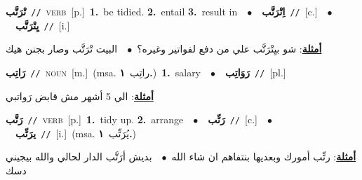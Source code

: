 \documentclass[10pt,a4paper,twoside]{article} %
\begin{document}
\begin{multicols}{2}
{\setlength\topsep{0pt}\textbf{\foreignlanguage{arabic}{تْرَتَّب}}\ {\color{gray}\texttt{//}\color{black}}\ \textsc{verb}\ [p.]\ \textbf{1.}~be tidied.  \textbf{2.}~entail  \textbf{3.}~result in\ \ $\bullet$\ \ \setlength\topsep{0pt}\textbf{\foreignlanguage{arabic}{اِتْرَتَّب}}\ {\color{gray}\texttt{//}\color{black}}\ [c.]\ \ $\bullet$\ \ \setlength\topsep{0pt}\textbf{\foreignlanguage{arabic}{يِتْرَتَّب}}\ {\color{gray}\texttt{//}\color{black}}\ [i.]\  \begin{flushright}\color{gray}\foreignlanguage{arabic}{\textbf{\underline{\foreignlanguage{arabic}{أمثلة}}}: شو بيِتْرَتَّب علي من دفع لفواتير وغيره؟\ $\bullet$\ \  البيت تْرَتَّب وصار بجنن هيك}\end{flushright}\color{black}} \vspace{2mm}

{\setlength\topsep{0pt}\textbf{\foreignlanguage{arabic}{رَاتِب}}\ {\color{gray}\texttt{//}\color{black}}\ \textsc{noun}\ [m.]\ \color{gray}(msa. \foreignlanguage{arabic}{راتِب}~\foreignlanguage{arabic}{\textbf{١.}})\color{black}\ \textbf{1.}~salary\ \ $\bullet$\ \ \setlength\topsep{0pt}\textbf{\foreignlanguage{arabic}{رَوَاتِب}}\ {\color{gray}\texttt{//}\color{black}}\ [pl.]\  \begin{flushright}\color{gray}\foreignlanguage{arabic}{\textbf{\underline{\foreignlanguage{arabic}{أمثلة}}}: الي 5 أشهر مش قابض رَواتبي}\end{flushright}\color{black}} \vspace{2mm}

{\setlength\topsep{0pt}\textbf{\foreignlanguage{arabic}{رَتَّب}}\ {\color{gray}\texttt{//}\color{black}}\ \textsc{verb}\ [p.]\ \textbf{1.}~tidy up.  \textbf{2.}~arrange\ \ $\bullet$\ \ \setlength\topsep{0pt}\textbf{\foreignlanguage{arabic}{رَتِّب}}\ {\color{gray}\texttt{//}\color{black}}\ [c.]\ \ $\bullet$\ \ \setlength\topsep{0pt}\textbf{\foreignlanguage{arabic}{يرَتِّب}}\ {\color{gray}\texttt{//}\color{black}}\ [i.]\ \color{gray}(msa. \foreignlanguage{arabic}{يُرَتِّب}~\foreignlanguage{arabic}{\textbf{١.}})\color{black}\  \begin{flushright}\color{gray}\foreignlanguage{arabic}{\textbf{\underline{\foreignlanguage{arabic}{أمثلة}}}: رتِّب أمورك وبعديها بنتفاهم ان شاء الله\ $\bullet$\ \  بديش أرَتَّب الدار لحالي والله بيجيني دسك}\end{flushright}\color{black}} \vspace{2mm}


\end{multicols}
\end{document}
